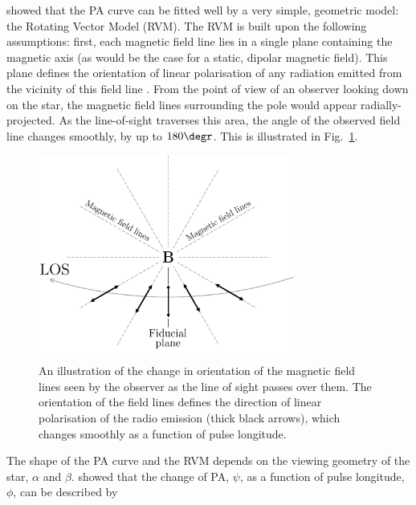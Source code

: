 \citet{RCxx1969} showed that the PA curve can be fitted well by a very simple, geometric model: the Rotating Vector Model (RVM). The RVM is built upon the following assumptions: first, each magnetic field line lies in a single plane containing the magnetic axis (as would be the case for a static, dipolar magnetic field). This plane defines the orientation of linear polarisation of any radiation emitted from the vicinity of this field line \citep[e.g.][]{Cxxx2015}. From the point of view of an observer looking down on the star, the magnetic field lines surrounding the pole would appear radially-projected. As the line-of-sight traverses this area, the angle of the observed field line changes smoothly, by up to $180\degr$. This is illustrated in Fig.~\ref{fig: intro - RVM field line schematic}.
\begin{figure}
    \begin{center}
        \includegraphics[width=0.75\textwidth]{Figures/Introduction/PA_curve_illustration}
        \caption[How the local magnetic field direction determines the PA as the pulsar rotates]{An illustration of the change in orientation of the magnetic field lines seen by the observer as the line of sight passes over them. The orientation of the field lines defines the direction of linear polarisation of the radio emission (thick black arrows), which changes smoothly as a function of pulse longitude.}
        \label{fig: intro - RVM field line schematic}
    \end{center}
\end{figure}
The shape of the PA curve and the RVM depends on the viewing geometry of the star, $\alpha$ and $\beta$. \citet{Kxxx1970} showed that the change of PA, $\psi$, as a function of pulse longitude, $\phi$, can be described by 
